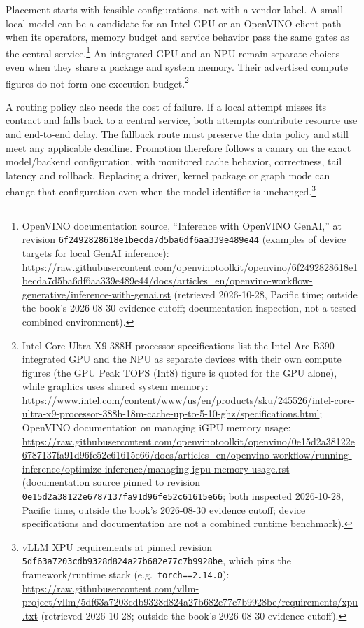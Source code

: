 Placement starts with feasible configurations, not with a vendor label.
A small local model can be a candidate for an Intel GPU or an OpenVINO
client path when its operators, memory budget and service behavior pass
the same gates as the central service.\footnote{\raggedright

  OpenVINO documentation source, ``Inference with OpenVINO GenAI,'' at
  revision \texttt{6f2492828618e1becda7d5ba6df6aa339e489e44} (examples
  of device targets for local GenAI inference):
  \url{https://raw.githubusercontent.com/openvinotoolkit/openvino/6f2492828618e1becda7d5ba6df6aa339e489e44/docs/articles_en/openvino-workflow-generative/inference-with-genai.rst}
  (retrieved 2026-10-28, Pacific time; outside the book's 2026-08-30
  evidence cutoff; documentation inspection, not a tested combined
  environment).} An integrated GPU and an NPU remain separate choices
even when they share a package and system memory. Their advertised
compute figures do not form one execution budget.\footnote{Intel Core
  Ultra X9 388H processor specifications list the Intel Arc B390
  integrated GPU and the NPU as separate devices with their own compute
  figures (the GPU Peak TOPS (Int8) figure is quoted for the GPU alone),
  while graphics uses shared system memory:
  \url{https://www.intel.com/content/www/us/en/products/sku/245526/intel-core-ultra-x9-processor-388h-18m-cache-up-to-5-10-ghz/specifications.html};
  OpenVINO documentation on managing iGPU memory usage:
  \url{https://raw.githubusercontent.com/openvinotoolkit/openvino/0e15d2a38122e6787137fa91d96fe52c61615e66/docs/articles_en/openvino-workflow/running-inference/optimize-inference/managing-igpu-memory-usage.rst}
  (documentation source pinned to revision
  \texttt{0e15d2a38122e6787137fa91d96fe52c61615e66}; both inspected
  2026-10-28, Pacific time, outside the book's 2026-08-30 evidence
  cutoff; device specifications and documentation are not a combined
  runtime benchmark).}

A routing policy also needs the cost of failure. If a local attempt
misses its contract and falls back to a central service, both attempts
contribute resource use and end-to-end delay. The fallback route must
preserve the data policy and still meet any applicable deadline.
Promotion therefore follows a canary on the exact model/backend
configuration, with monitored cache behavior, correctness, tail latency
and rollback. Replacing a driver, kernel package or graph mode can
change that configuration even when the model identifier is
unchanged.\footnote{\raggedright

  vLLM XPU requirements at pinned revision
  \texttt{5df63a7203cdb9328d824a27b682e77c7b9928be}, which pins the
  framework/runtime stack (e.g.~\texttt{torch==2.14.0}):
  \url{https://raw.githubusercontent.com/vllm-project/vllm/5df63a7203cdb9328d824a27b682e77c7b9928be/requirements/xpu.txt}
  (retrieved 2026-10-28; outside the book's 2026-08-30 evidence cutoff).}

